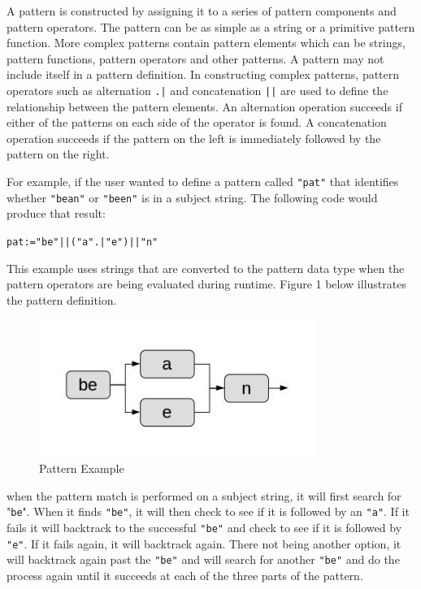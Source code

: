 \documentclass{article}
\begin{document}
A pattern is constructed by assigning it to a series of pattern components and pattern operators.  The pattern can be as simple as a string or a primitive pattern function.  More complex patterns contain pattern elements which can be strings, pattern functions, pattern operators and other patterns.  A pattern may not include itself in a pattern definition.  In constructing complex patterns, pattern operators such as alternation \texttt{.|} and concatenation \texttt{||} are used to define the relationship between the pattern elements.  An alternation operation succeeds if either of the patterns on each side of the operator is found.  A concatenation operation succeeds if the pattern on the left is immediately followed by the pattern on the right.

For example, if the user wanted to define a pattern called \texttt{"pat"} that identifies whether \texttt{"bean"} or \texttt{"been"} is in a subject string.  The following code would produce that result:\\
\begin{alltt}
        pat := "be" || ( "a" .| "e" ) || "n"
\end{alltt}
This example uses strings that are converted to the pattern data type when the pattern operators are being evaluated during runtime.  Figure 1 below illustrates the pattern definition.  
\begin{figure}[ht!]
\centering
\includegraphics[width=90mm]{bean.jpg}
\caption{Pattern Example\label{overflow}}
\end{figure}
when the pattern match is performed on a subject string, it will first search for "\texttt{be}".  When it finds \texttt{"be"}, it will then check to see if it is followed by an \texttt{"a"}.  If it fails it will backtrack to the successful \texttt{"be"} and check to see if it is followed by \texttt{"e"}.  If it fails again, it will backtrack again.  There not being another option, it will backtrack again past the \texttt{"be"} and will search for another \texttt{"be"} and do the process again until it succeeds at each of the three parts of the pattern. 
\end{document}
